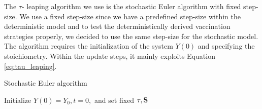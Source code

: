 The $\tau$- leaping algorithm we use is the stochastic Euler algorithm with fixed step-size. We use a fixed step-size since we have a predefined step-size within the deterministic model and to test the deterministically derived vaccination strategies properly, we decided to use the same step-size for the stochastic model. The algorithm requires the initialization of the system $Y(0)$ and specifying the stoichiometry. Within the update steps, it mainly exploits Equation \eqref{eq:tau_leaping}.\\

\begin{algorithm}[H]
 \caption{Stochastic Euler algorithm}
\SetAlgoLined
{}
 Initialize $Y(0) = Y_0, t=0,$ and set fixed $\tau, \mathbf{S}$\;

\end{algorithm}

